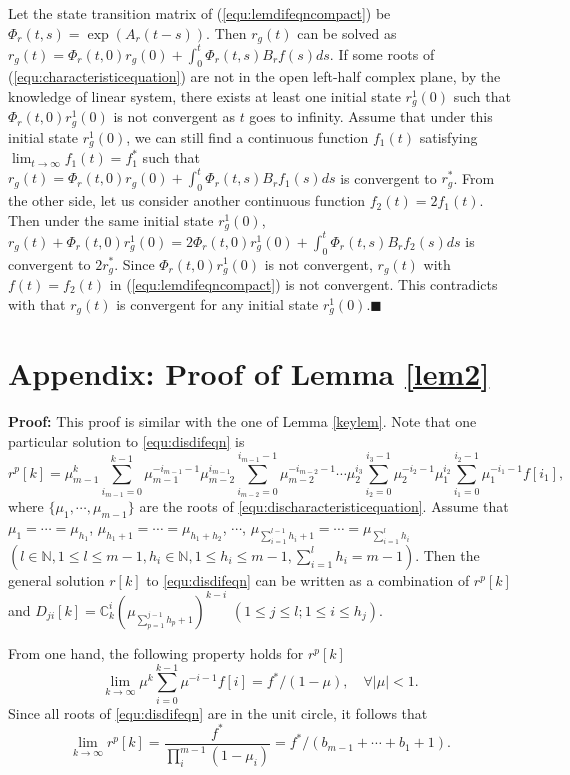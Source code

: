 \documentclass[12pt,draftcls,onecolumn]{IEEEtran}
\begin{document}
Let the state transition matrix of (\ref{equ:lemdifeqncompact}) be $\Phi_r(t,s) = \exp(A_r(t-s))$. Then $r_g(t)$ can be solved as $r_g(t) = \Phi_r(t,0)r_g(0) + \int^t_0\Phi_r(t,s)B_rf(s)ds$.
If some roots of (\ref{equ:characteristicequation}) are not in the open left-half complex plane, by the knowledge of linear system, there exists at least one initial state $r^1_g(0)$ such that $\Phi_r(t,0)r^1_g(0)$ is not convergent as $t$ goes to infinity. Assume that under this initial state $r^1_g(0)$, we can still find a continuous function $f_1(t)$ satisfying $\lim_{t\to\infty}f_1(t) = f^*_1$ such that $r_g(t) = \Phi_r(t,0)r_g(0) + \int^t_0\Phi_r(t,s)B_rf_1(s)ds$ is convergent to $r^*_g$. From the other side, let us consider another continuous function $f_2(t) = 2f_1(t)$. Then under the same initial state $r^1_g(0)$, $r_g(t) + \Phi_r(t,0)r^1_g(0) = 2\Phi_r(t,0)r^1_g(0) + \int^t_0\Phi_r(t,s)B_rf_2(s)ds$ is convergent to $2r^*_g$. Since $\Phi_r(t,0)r^1_g(0)$ is not convergent, $r_g(t)$ with $f(t) = f_2(t)$ in (\ref{equ:lemdifeqncompact}) is not convergent. This contradicts with that $r_g(t)$ is convergent for any initial state $r^1_g(0)$.$\blacksquare$

\section*{Appendix: Proof of Lemma \ref{lem2}}
\textbf{Proof:}  This proof is similar with the one of Lemma \ref{keylem}. Note that one particular solution to \eqref{equ:disdifeqn} is
\begin{equation}
r^p[k] = \mu^k_{m-1}\sum^{k-1}_{i_{m-1}=0}\mu^{-i_{m-1}-1}_{m-1}\mu^{i_{m-1}}_{m-2}\sum^{i_{m-1}-1}_{i_{m-2}=0}\mu^{-i_{m-2}-1}_{m-2}\cdots\mu^{i_3}_2\sum^{i_3-1}_{i_2=0}\mu^{-i_2-1}_{2}\mu^{i_2}_1\sum_{i_1=0}^{i_2-1}\mu^{-i_1-1}_1f[i_1],
\end{equation}
where $\{\mu_1,\cdots,\mu_{m-1}\}$ are the roots of \eqref{equ:discharacteristicequation}. Assume that $\mu_1 = \cdots = \mu_{h_1}$, $\mu_{h_1+1} = \cdots = \mu_{h_1+h_2}$, $\cdots$, $\mu_{\sum^{l-1}_{i=1}h_i+1} = \cdots = \mu_{\sum^{l}_{i=1}h_i}$ $(l \in \mathbb{N}, 1 \leq l \leq m-1, h_i \in \mathbb{N}, 1 \leq h_i \leq m-1, \sum^l_{i=1}h_i = m-1)$. Then the general solution $r[k]$ to \eqref{equ:disdifeqn} can be written as a combination of $r^p[k]$ and $D_{ji}[k] = \mathbb{C}^{i}_{k}\left(\mu_{\sum^{j-1}_{p=1}h_p+1}\right)^{k-i}$ $(1 \leq j \leq l; 1 \leq i \leq h_j)$.

From one hand, the following property holds for $r^p[k]$
\begin{equation}
\lim_{k\to\infty}\mu^k\sum^{k-1}_{i=0}\mu^{-i-1}f[i] = f^*/(1-\mu), \quad \forall |\mu| < 1.
\end{equation}
Since all roots of \eqref{equ:disdifeqn} are in the unit circle, it follows that
\begin{equation}
\lim_{k\to\infty}r^p[k] = \frac{f^*}{\prod^{m-1}_i(1-\mu_i)} = f^*/(b_{m-1} + \cdots + b_1 + 1).
\end{equation}
\end{document}
